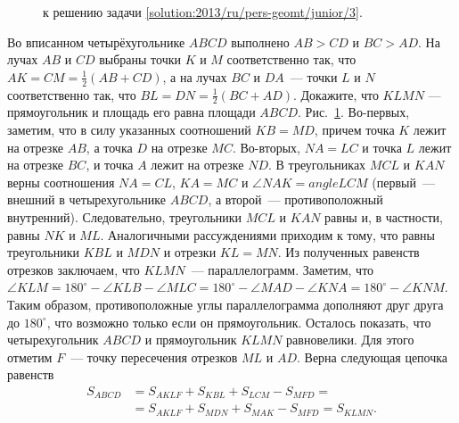\ifsolution
\begin{figure}\centering
    \caption{к решению задачи \ref{solution:2013/ru/pers-geomt/junior/3}.}
    \label{fig:solution:2013/ru/pers-geomt/junior/3}
\end{figure}
\fi %

\problem
Во вписанном четырёхугольнике $ABCD$ выполнено $AB > CD$ и $BC > AD$.
На лучах $AB$ и $CD$ выбраны точки $K$ и $M$ соответственно так, что
$AK = CM = \frac{1}{2} (AB + CD)$,
а на лучах $BC$ и $DA$~--- точки $L$ и $N$ соответственно так, что
$BL = DN = \frac{1}{2} (BC + AD)$.
Докажите, что $KLMN$ --- прямоугольник и 
площадь его равна площади $ABCD$.
\solution 
\label{solution:2013/ru/pers-geomt/junior/3}
Рис.~\ref{fig:solution:2013/ru/pers-geomt/junior/3}.
Во-первых, заметим, что в силу указанных соотношений $KB = MD$, причем точка
$K$ лежит на отрезке $AB$, а точка $D$ на отрезке $MC$.
Во-вторых, $NA = LC$ и точка $L$ лежит на отрезке $BC$, и точка $A$ лежит на
отрезке $ND$.
В треугольниках $MCL$ и $KAN$ верны соотношения $NA = CL$, $KA = MC$ и
$\angle NAK = angle LCM$ (первый~--- внешний в четырехугольнике $ABCD$, а
второй~--- противоположный внутренний).
Следовательно, треугольники $MCL$ и $KAN$ равны и, в частности, равны $NK$ и
$ML$.
Аналогичными рассуждениями приходим к тому, что равны треугольники $KBL$ и
$MDN$ и отрезки $KL = MN$.
Из полученных равенств отрезков заключаем, что $KLMN$~--- параллелограмм.
Заметим, что
\(
    \angle KLM
=
    180^\circ - \angle KLB - \angle MLC
=
    180^\circ - \angle MAD - \angle KNA
=
    180^\circ - \angle KNM
\).
Таким образом, противоположные углы параллелограмма дополняют друг друга до
$180^\circ$, что возможно только если он прямоугольник.
Осталось показать, что четырехугольник $ABCD$ и прямоугольник $KLMN$
равновелики.
Для этого отметим $F$~--- точку пересечения отрезков $ML$ и $AD$.
Верна следующая цепочка равенств
\begin{align*}
    S_{ABCD}
&{}=
    S_{AKLF} + S_{KBL} + S_{LCM} - S_{MFD}
=\\&{}=
    S_{AKLF} + S_{MDN} + S_{MAK} - S_{MFD}
=
    S_{KLMN}.
\end{align*}
\endproblem
